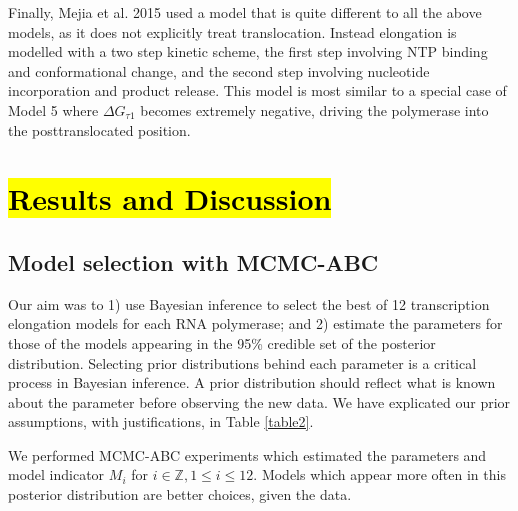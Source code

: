 \documentclass[10pt,letterpaper]{article}
\begin{document}
Finally, Mejia et al. 2015 \cite{mejia2015trigger} used a model that is quite different to all the above models, as it does not explicitly treat translocation. Instead elongation is modelled with a two step kinetic scheme, the first step involving NTP binding and conformational change, and the second step involving nucleotide incorporation and product release. This model is most similar to a special case of Model 5 where $\Delta G_{\tau 1}$ becomes extremely negative, driving the polymerase into the posttranslocated position.  






\section*{\hl{Results and Discussion}}





\subsection*{Model selection with MCMC-ABC}


Our aim was to 1) use Bayesian inference to select the best of 12 transcription elongation models for each RNA polymerase; and 2) estimate the parameters for those of the models appearing in the 95\% credible set of the posterior distribution. Selecting prior distributions behind each parameter is a  critical process in Bayesian inference. A prior distribution should reflect what is known about the parameter before observing the new data. We have explicated our prior assumptions, with justifications, in Table \ref{table2}. \par


We performed MCMC-ABC experiments which estimated the parameters and model indicator $M_i$ for $i \in \mathbb{Z}, 1 \leq i \leq 12$. Models which appear more often in this posterior distribution are better choices, given the data. \par  
\end{document}
